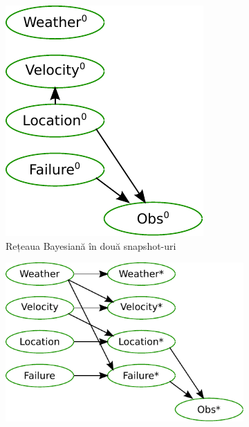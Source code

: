 \begin{frame}[t]
  	\begin{figure}
  		\centering
		\begin{subfigure}[b]{0.15\textwidth}
			\centering
  			\includegraphics[width=\textwidth]{graphics/hmm-intro/dbn-vehicle/zero.pdf}
  			\caption{\tiny{Rețeaua Bayesiană în două snapshot-uri}}
  			\label{fig:2TBN}
  		\end{subfigure}
  		\begin{subfigure}[b]{0.30\textwidth}
			\centering
			\includegraphics[width=\textwidth]{graphics/hmm-intro/dbn-vehicle/transition.pdf}

\end{subfigure}
\end{figure}
\end{frame}
